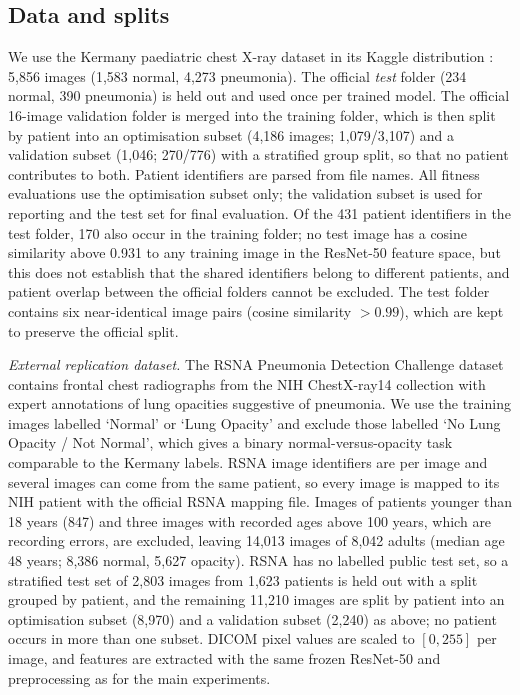 \documentclass[10pt,letterpaper]{article}
\begin{document}
\subsection{Data and splits}
We use the Kermany paediatric chest X-ray dataset \citep{kermany2018} in its Kaggle distribution \citep{kaggle2018cxr}: 5,856 images (1,583 normal, 4,273 pneumonia). The official \emph{test} folder (234 normal, 390 pneumonia) is held out and used once per trained model. The official 16-image validation folder is merged into the training folder, which is then split by patient into an optimisation subset (4,186 images; 1,079/3,107) and a validation subset (1,046; 270/776) with a stratified group split, so that no patient contributes to both. Patient identifiers are parsed from file names. All fitness evaluations use the optimisation subset only; the validation subset is used for reporting and the test set for final evaluation. Of the 431 patient identifiers in the test folder, 170 also occur in the training folder; no test image has a cosine similarity above 0.931 to any training image in the ResNet-50 feature space, but this does not establish that the shared identifiers belong to different patients, and patient overlap between the official folders cannot be excluded. The test folder contains six near-identical image pairs (cosine similarity $>0.99$), which are kept to preserve the official split.

\emph{External replication dataset.} The RSNA Pneumonia Detection Challenge dataset \citep{shih2019rsna} contains frontal chest radiographs from the NIH ChestX-ray14 collection with expert annotations of lung opacities suggestive of pneumonia. We use the training images labelled `Normal' or `Lung Opacity' and exclude those labelled `No Lung Opacity / Not Normal', which gives a binary normal-versus-opacity task comparable to the Kermany labels. RSNA image identifiers are per image and several images can come from the same patient, so every image is mapped to its NIH patient with the official RSNA mapping file. Images of patients younger than 18 years (847) and three images with recorded ages above 100 years, which are recording errors, are excluded, leaving 14,013 images of 8,042 adults (median age 48 years; 8,386 normal, 5,627 opacity). RSNA has no labelled public test set, so a stratified test set of 2,803 images from 1,623 patients is held out with a split grouped by patient, and the remaining 11,210 images are split by patient into an optimisation subset (8,970) and a validation subset (2,240) as above; no patient occurs in more than one subset. DICOM pixel values are scaled to $[0,255]$ per image, and features are extracted with the same frozen ResNet-50 and preprocessing as for the main experiments.
\end{document}
